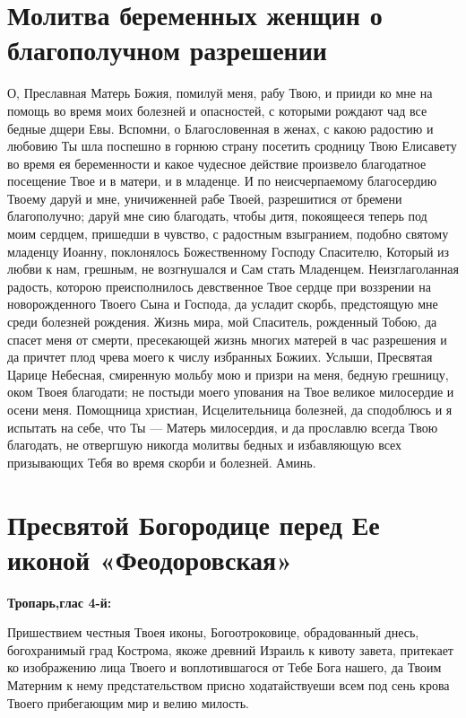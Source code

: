 \section{Молитва беременных женщин о благополучном разрешении}
 


О, Преславная Матерь Божия, помилуй меня, рабу Твою, и прииди ко мне на помощь во время моих болезней и опасностей, с которыми рождают чад все бедные дщери Евы. Вспомни, о Благословенная в женах, с какою радостию и любовию Ты шла поспешно в горнюю страну посетить сродницу Твою Елисавету во время ея беременности и какое чудесное действие произвело благодатное посещение Твое и в матери, и в младенце. И по неисчерпаемому благосердию Твоему даруй и мне, уничиженней рабе Твоей, разрешитися от бремени благополучно; даруй мне сию благодать, чтобы дитя, покоящееся теперь под моим сердцем, пришедши в чувство, с радостным взыгранием, подобно святому младенцу Иоанну, поклонялось Божественному Господу Спасителю, Который из любви к нам, грешным, не возгнушался и Сам стать Младенцем. Неизглаголанная радость, которою преисполнилось девственное Твое сердце при воззрении на новорожденного Твоего Сына и Господа, да усладит скорбь, предстоящую мне среди болезней рождения. Жизнь мира, мой Спаситель, рожденный Тобою, да спасет меня от смерти, пресекающей жизнь многих матерей в час разрешения и да причтет плод чрева моего к числу избранных Божиих. Услыши, Пресвятая Царице Небесная, смиренную мольбу мою и призри на меня, бедную грешницу, оком Твоея благодати; не постыди моего упования на Твое великое милосердие и осени меня. Помощница христиан, Исцелительница болезней, да сподоблюсь и я испытать на себе, что Ты — Матерь милосердия, и да прославлю всегда Твою благодать, не отвергшую никогда молитвы бедных и избавляющую всех призывающих Тебя во время скорби и болезней. Аминь. 


\section{Пресвятой Богородице перед Ее иконой «Феодоровская»}
 
\bfseries Тропарь,глас 4-й:\normalfont{}


Пришествием честныя Твоея иконы, Богоотроковице, обрадованный днесь, богохранимый град Кострома, якоже древний Израиль к кивоту завета, притекает ко изображению лица Твоего и воплотившагося от Тебе Бога нашего, да Твоим Матерним к нему предстательством присно ходатайствуеши всем под сень крова Твоего прибегающим мир и велию милость.


